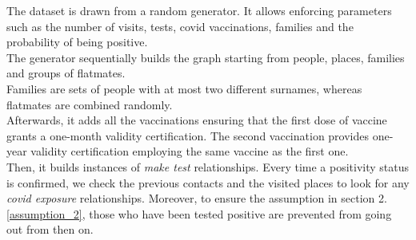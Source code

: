 \label{section: 4}
The dataset is drawn from a random generator. It allows enforcing parameters such as the number of visits, tests, covid vaccinations, families and the probability of being positive. \\
The generator sequentially builds the graph starting from people, places, families and groups of flatmates. \\
Families are sets of people with at most two different surnames, whereas flatmates are combined randomly. \\
Afterwards, it adds all the vaccinations ensuring that the first dose of vaccine grants a one-month validity certification. The second vaccination provides one-year validity certification employing the same vaccine as the first one. \\
Then, it builds instances of \textit{make test} relationships. 
Every time a positivity status is confirmed, we check the previous contacts and the visited places to look for any \textit{covid exposure} relationships. Moreover,  to ensure the assumption in section 2.\ref{assumption_2}, those who have been tested positive are prevented from going out from then on.